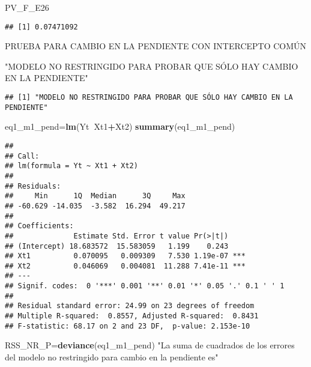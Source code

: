\documentclass[
]{article}
\newenvironment{Shaded}{\begin{snugshade}}{\end{snugshade}}
\newcommand{\KeywordTok}[1]{\textcolor[rgb]{0.13,0.29,0.53}{\textbf{#1}}}
\newcommand{\NormalTok}[1]{#1}
\newcommand{\OperatorTok}[1]{\textcolor[rgb]{0.81,0.36,0.00}{\textbf{#1}}}
\newcommand{\StringTok}[1]{\textcolor[rgb]{0.31,0.60,0.02}{#1}}
\begin{document}
\begin{Shaded}
\begin{Highlighting}[]
\NormalTok{PV_F_E26}
\end{Highlighting}
\end{Shaded}

\begin{verbatim}
## [1] 0.07471092
\end{verbatim}

PRUEBA PARA CAMBIO EN LA PENDIENTE CON INTERCEPTO COMÚN

\begin{Shaded}
\begin{Highlighting}[]
\StringTok{"MODELO NO RESTRINGIDO PARA PROBAR QUE SÓLO HAY CAMBIO EN LA PENDIENTE"}
\end{Highlighting}
\end{Shaded}

\begin{verbatim}
## [1] "MODELO NO RESTRINGIDO PARA PROBAR QUE SÓLO HAY CAMBIO EN LA PENDIENTE"
\end{verbatim}

\begin{Shaded}
\begin{Highlighting}[]
\NormalTok{eq1_m1_pend=}\KeywordTok{lm}\NormalTok{(Yt}\OperatorTok{~}\NormalTok{Xt1}\OperatorTok{+}\NormalTok{Xt2)}
\KeywordTok{summary}\NormalTok{(eq1_m1_pend)}
\end{Highlighting}
\end{Shaded}

\begin{verbatim}
## 
## Call:
## lm(formula = Yt ~ Xt1 + Xt2)
## 
## Residuals:
##     Min      1Q  Median      3Q     Max 
## -60.629 -14.035  -3.582  16.294  49.217 
## 
## Coefficients:
##              Estimate Std. Error t value Pr(>|t|)    
## (Intercept) 18.683572  15.583059   1.199    0.243    
## Xt1          0.070095   0.009309   7.530 1.19e-07 ***
## Xt2          0.046069   0.004081  11.288 7.41e-11 ***
## ---
## Signif. codes:  0 '***' 0.001 '**' 0.01 '*' 0.05 '.' 0.1 ' ' 1
## 
## Residual standard error: 24.99 on 23 degrees of freedom
## Multiple R-squared:  0.8557, Adjusted R-squared:  0.8431 
## F-statistic: 68.17 on 2 and 23 DF,  p-value: 2.153e-10
\end{verbatim}

\begin{Shaded}
\begin{Highlighting}[]
\NormalTok{RSS_NR_P=}\KeywordTok{deviance}\NormalTok{(eq1_m1_pend)}
\StringTok{"La suma de cuadrados de los errores del modelo no restringido para cambio en la pendiente es"}
\end{Highlighting}
\end{Shaded}
\end{document}
